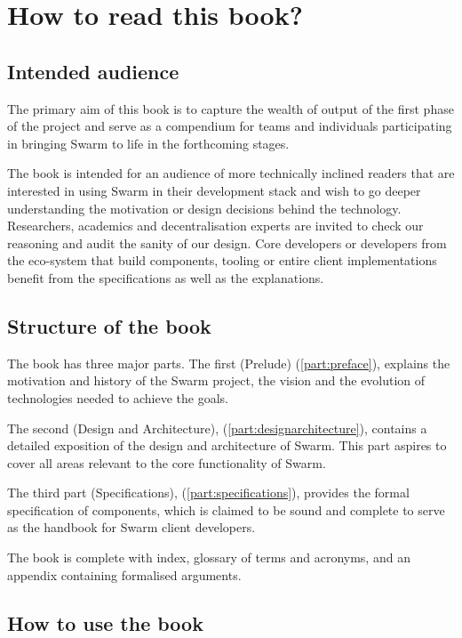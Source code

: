 \chapter{How to read this book?}

\section{Intended audience}
The primary aim of this book is to capture the wealth of output of the first phase of the project and serve as a compendium for teams and individuals participating in bringing Swarm to life in the forthcoming stages.

The book is intended for an audience of more technically inclined readers that are interested in using Swarm in their development stack and wish to go deeper understanding the motivation or design decisions behind the technology. Researchers, academics and decentralisation experts are invited to check our reasoning and audit the sanity of our design. Core developers or developers from the eco-system that build components, tooling or entire client implementations benefit from the specifications as well as the explanations.

\section{Structure of the book}

The book has three major parts. The first (Prelude) (\ref{part:preface}), explains the motivation and history of the Swarm project, the vision and the evolution of technologies needed to achieve the goals.

The second (Design and Architecture), (\ref{part:designarchitecture}), contains a detailed exposition of the design and architecture of Swarm. This part aspires to cover all areas relevant to the core functionality of Swarm.

The third part (Specifications), (\ref{part:specifications}), provides the formal specification of components, which is claimed to be sound and complete to serve as the handbook for Swarm client developers.

The book is complete with index, glossary of terms and acronyms, and an appendix containing formalised arguments.

\section{How to use the book}

